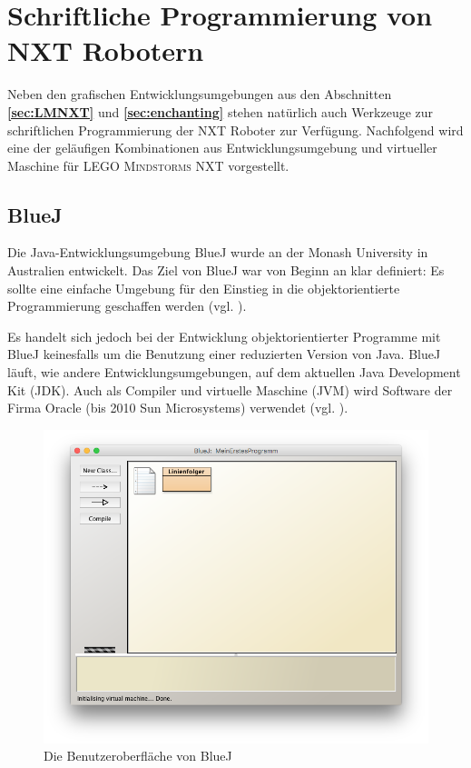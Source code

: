 \documentclass[paper=a4, DIV=calc, BCOR=12mm, twoside=on, onecolumn=on, open = right, titlepage =on, parskip =half-, headsepline = on, footsepline = off, chapterprefix = off, appendixprefix = on, fontsize = 12pt, numbers = noenddot, abstract = on]{scrbook}
\begin{document}
\section{Schriftliche Programmierung von NXT Robotern}
\label{sec:bluejetc}
Neben den grafischen Entwicklungsumgebungen aus den Abschnitten \textbf{\ref{sec:LMNXT}} und \textbf{\ref{sec:enchanting}} stehen natürlich auch Werkzeuge zur schriftlichen Programmierung der NXT Roboter zur Verfügung. Nachfolgend wird eine der geläufigen Kombinationen aus Entwicklungsumgebung und virtueller Maschine für \textsc{LEGO Mindstorms} NXT vorgestellt. 
\vfill

\subsection{BlueJ}
\label{sec:bluej}
Die Java-Entwicklungsumgebung BlueJ wurde an der Monash University in Australien entwickelt. Das Ziel von BlueJ war von Beginn an klar definiert: Es sollte eine einfache Umgebung für den Einstieg in die objektorientierte Programmierung geschaffen werden (vgl. \cite[S.14]{barnes:03}).

Es handelt sich jedoch bei der Entwicklung objektorientierter Programme mit BlueJ keinesfalls um die Benutzung einer reduzierten Version von Java. BlueJ läuft, wie andere Entwicklungsumgebungen, auf dem aktuellen Java Development Kit (JDK). Auch als Compiler und virtuelle Maschine (JVM) wird Software der Firma Oracle (bis 2010 Sun Microsystems) verwendet (vgl. \cite[S.15]{barnes:03}).

\begin{figure}[htb]
\centering
\includegraphics[width=\textwidth]{images/firstprogram.png}
\caption{Die Benutzeroberfläche von BlueJ}
\label{fig:BlueJ UI}
\end{figure}
\end{document}
